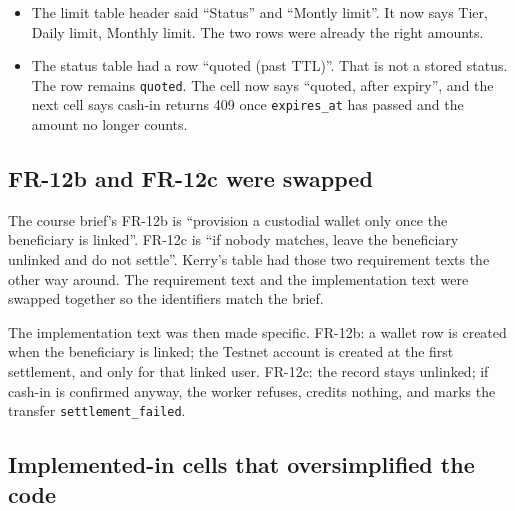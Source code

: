 \documentclass[11pt,a4paper]{article}
\begin{document}
\begin{itemize}
\item The limit table header said ``Status'' and ``Montly limit''.
It now says Tier, Daily limit, Monthly limit.
The two rows were already the right amounts.
\item The status table had a row ``quoted (past TTL)''.
That is not a stored status.
The row remains \texttt{quoted}.
The cell now says ``quoted, after expiry'', and the next cell says cash-in returns 409 once \texttt{expires\_at} has passed and the amount no longer counts.
\end{itemize}

\subsection{FR-12b and FR-12c were swapped}

The course brief's FR-12b is ``provision a custodial wallet only once the beneficiary is linked''.
FR-12c is ``if nobody matches, leave the beneficiary unlinked and do not settle''.
Kerry's table had those two requirement texts the other way around.
The requirement text and the implementation text were swapped together so the identifiers match the brief.

The implementation text was then made specific.
FR-12b: a wallet row is created when the beneficiary is linked; the Testnet account is created at the first settlement, and only for that linked user.
FR-12c: the record stays unlinked; if cash-in is confirmed anyway, the worker refuses, credits nothing, and marks the transfer \texttt{settlement\_failed}.

\subsection{Implemented-in cells that oversimplified the code}
\end{document}
